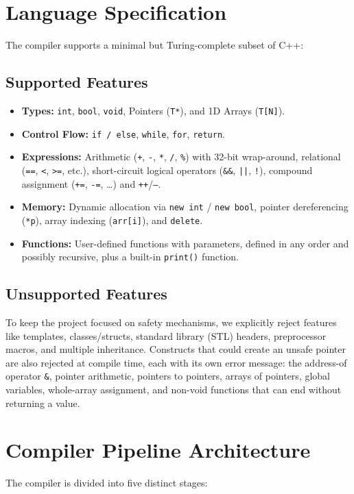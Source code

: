 \documentclass[12pt, a4paper]{article}
\begin{document}
\section{Language Specification}
The compiler supports a minimal but Turing-complete subset of C++:

\subsection{Supported Features}
\begin{itemize}
    \item \textbf{Types:} \texttt{int}, \texttt{bool}, \texttt{void}, Pointers (\texttt{T*}), and 1D Arrays (\texttt{T[N]}).
    \item \textbf{Control Flow:} \texttt{if / else}, \texttt{while}, \texttt{for}, \texttt{return}.
    \item \textbf{Expressions:} Arithmetic (\texttt{+}, \texttt{-}, \texttt{*}, \texttt{/}, \texttt{\%}) with 32-bit wrap-around, relational (\texttt{==}, \texttt{<}, \texttt{>=}, etc.), short-circuit logical operators (\texttt{\&\&}, \texttt{||}, \texttt{!}), compound assignment (\texttt{+=}, \texttt{-=}, \ldots) and \texttt{++}/\texttt{--}.
    \item \textbf{Memory:} Dynamic allocation via \texttt{new int} / \texttt{new bool}, pointer dereferencing (\texttt{*p}), array indexing (\texttt{arr[i]}), and \texttt{delete}.
    \item \textbf{Functions:} User-defined functions with parameters, defined in any order and possibly recursive, plus a built-in \texttt{print()} function.
\end{itemize}

\subsection{Unsupported Features}
To keep the project focused on safety mechanisms, we explicitly reject features like templates, classes/structs, standard library (STL) headers, preprocessor macros, and multiple inheritance. Constructs that could create an unsafe pointer are also rejected at compile time, each with its own error message: the address-of operator \texttt{\&}, pointer arithmetic, pointers to pointers, arrays of pointers, global variables, whole-array assignment, and non-void functions that can end without returning a value.

\section{Compiler Pipeline Architecture}
The compiler is divided into five distinct stages:
\end{document}
